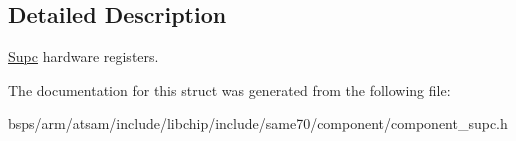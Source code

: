 \subsection{Detailed Description}
\mbox{\hyperlink{structSupc}{Supc}} hardware registers. 

The documentation for this struct was generated from the following file\+:\begin{DoxyCompactItemize}
\item 
bsps/arm/atsam/include/libchip/include/same70/component/component\+\_\+supc.\+h\end{DoxyCompactItemize}
